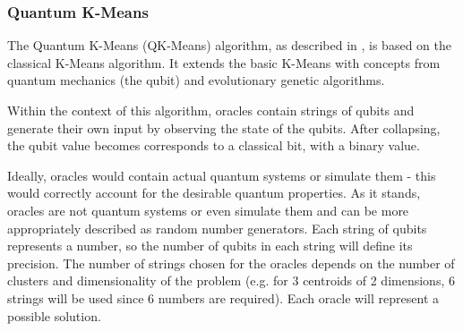 

\subsubsection{Quantum K-Means}





The Quantum K-Means (QK-Means) algorithm, as described in \cite{Casper2012KMeans}, is based on the classical K-Means algorithm.
It extends the basic K-Means with concepts from quantum mechanics (the qubit) and evolutionary genetic algorithms.

Within the context of this algorithm, oracles contain strings of qubits and generate their own input by observing the state of the qubits.
After collapsing, the qubit value becomes corresponds to a classical bit, with a binary value.

Ideally, oracles would contain actual quantum systems or simulate them - this would correctly account for the desirable quantum properties.
As it stands, oracles are not quantum systems or even simulate them and can be more appropriately described as random number generators.
Each string of qubits represents a number, so the number of qubits in each string will define its precision.
The number of strings chosen for the oracles depends on the number of clusters and dimensionality of the problem (e.g. for 3 centroids of 2 dimensions, 6 strings will be used since 6 numbers are required).
Each oracle will represent a possible solution.

